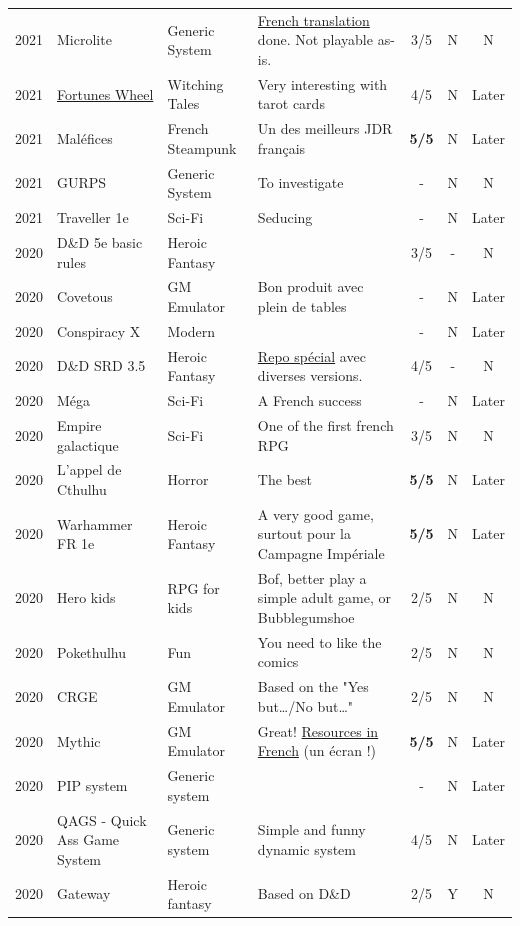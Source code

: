 \documentclass[a4paper, 11pt, twoside]{article}
\begin{document}
\begin{longtable}{cp{2cm}p{1.5cm}p{7cm}ccc}
2021 & Microlite & Generic System & \href{https://github.com/orey/jdr/tree/master/Microlite20-fr}{French translation} done. Not playable as-is. & 3/5 & N & N\\
2021 & \href{http://www.fortuneswheel.co.uk/}{Fortunes Wheel} & Witching Tales & Very interesting with tarot cards & 4/5 & N & Later\\
2021 & Maléfices & French Steampunk & Un des meilleurs JDR français & \textbf{5/5} & N & Later\\
2021 & GURPS & Generic System & To investigate & - & N & N\\
2021 & Traveller 1e & Sci-Fi & Seducing & - & N & Later\\
2020 & D\&D 5e basic rules & Heroic Fantasy &  & 3/5 & - & N\\
2020 & Covetous & GM Emulator & Bon produit avec plein de tables & - & N & Later\\
2020 & Conspiracy X & Modern &  & - & N & Later\\
2020 & D\&D SRD 3.5 & Heroic Fantasy & \href{https://github.com/orey/srd-3.5}{Repo spécial} avec diverses versions. & 4/5 & - & N\\
2020 & Méga & Sci-Fi & A French success & - & N & Later\\
2020 & Empire galactique & Sci-Fi & One of the first french RPG & 3/5 & N & N\\
2020 & L'appel de Cthulhu & Horror & The best & \textbf{5/5} & N & Later\\
2020 & Warhammer FR 1e & Heroic Fantasy & A very good game, surtout pour la Campagne Impériale & \textbf{5/5} & N & Later\\
2020 & Hero kids & RPG for kids & Bof, better play a simple adult game, or Bubblegumshoe & 2/5 & N & N\\
2020 & Pokethulhu & Fun & You need to like the comics & 2/5 & N & N\\
2020 & CRGE & GM Emulator & Based on the "Yes but\ldots{}/No but\ldots{}" & 2/5 & N & N\\
2020 & Mythic & GM Emulator & Great! \href{https://github.com/orey/jdr/tree/master/Mythic-fr}{Resources in French} (un écran !) & \textbf{5/5} & N & Later\\
2020 & PIP system & Generic system &  & - & N & Later\\
2020 & QAGS - Quick Ass Game System & Generic system & Simple and funny dynamic system & 4/5 & N & Later\\
2020 & Gateway & Heroic fantasy & Based on D\&D & 2/5 & Y & N\\

\end{longtable}
\end{document}
